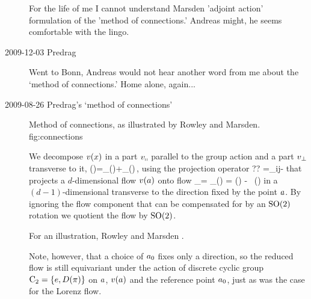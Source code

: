 \begin{description}
For the life of me I cannot understand Marsden 'adjoint action'
formulation of the 'method of connections.' Andreas might, he
seems comfortable with the lingo.

\item[2009-12-03 Predrag] Went to Bonn, Andreas would not hear
another word from me about the `method of connections.' Home
alone, again...



\item[2009-08-26 Predrag's `method of connections']

%
{}{
Method of connections, as illustrated by Rowley and
Marsden.
}
{fig:connections}
%


We decompose $v(x)$
in a part $v_\shortparallel$ parallel
to the group action and a part $v_\perp$ transverse to it,
\beq
	\vel(\ssp)=\vel_\shortparallel(\ssp)+\vel_\perp(\ssp)\,,
using the projection operator
\beq
 	?? %
 =\delta_{ij}-
that projects a $d$-dimensional flow $v(a)$ onto
flow
\beq
	\dot{\ssp}_\perp = \vel_\perp(\ssp) = \vel(\ssp)
    - 
      \, \groupTan(\ssp)
in a $(d\!-\!1)$-dimensional {\csection} transverse to the
direction fixed by the point $a$. By ignoring the flow
component that can be compensated for by an $\textrm{SO}(2)$
rotation we quotient the flow by $\textrm{SO}(2)$.

For an illustration, Rowley and
Marsden .


Note, however, that a choice of $a_0$ fixes only a
direction, so the reduced flow is still equivariant under the
action of discrete cyclic group $\textrm{C}_2 = \{e,D(\pi)\}$ on
$a$, $v(a)$ and the reference point $a_0$, just
as was the case %
for the Lorenz flow. %



\end{description}
